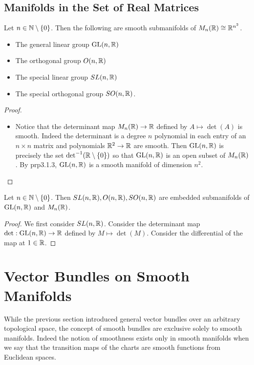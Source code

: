 \documentclass[a4paper]{article}
\begin{document}
\subsection{Manifolds in the Set of Real Matrices}
\begin{prp}{}{} Let $n\in\mathbb{N}\setminus\{0\}$. Then the following are smooth submanifolds of $M_n(\mathbb{R})\cong\mathbb{R}^{n^2}$. 
\begin{itemize}
\item The general linear group $\operatorname{GL}(n,\mathbb{R})$
\item The orthogonal group $O(n,\mathbb{R})$
\item The special linear group $SL(n,\mathbb{R})$
\item The special orthogonal group $SO(n,\mathbb{R})$. 
\end{itemize} \tcbline
\begin{proof}~\\
\begin{itemize}
\item Notice that the determinant map $M_n(\mathbb{R})\to\mathbb{R}$ defined by $A\mapsto\det(A)$ is smooth. Indeed the determinant is a degree $n$ polynomial in each entry of an $n\times n$ matrix and polynomials $\mathbb{R}^2\to\mathbb{R}$ are smooth. Then $\operatorname{GL}(n,\mathbb{R})$ is precisely the set $\det^{-1}(\mathbb{R}\setminus\{0\})$ so that $\operatorname{GL}(n,\mathbb{R})$ is an open subset of $M_n(\mathbb{R})$. By prp3.1.3, $\operatorname{GL}(n,\mathbb{R})$ is a smooth manifold of dimension $n^2$. 
\end{itemize}
\end{proof}
\end{prp}

\begin{prp}{}{} Let $n\in\mathbb{N}\setminus\{0\}$. Then $SL(n,\mathbb{R}),O(n,\mathbb{R}),SO(n,\mathbb{R})$ are embedded submanifolds of $\operatorname{GL}(n,\mathbb{R})$ and $M_n(\mathbb{R})$. \tcbline
\begin{proof}
We first consider $SL(n,\mathbb{R})$. Consider the determinant map $\det:\operatorname{GL}(n,\mathbb{R})\to\mathbb{R}$ defined by $M\mapsto\det(M)$. Consider the differential of the map at $1\in\mathbb{R}$. 
\end{proof}
\end{prp}

\pagebreak
\section{Vector Bundles on Smooth Manifolds}
While the previous section introduced general vector bundles over an arbitrary topological space, the concept of smooth bundles are exclusive solely to smooth manifolds. Indeed the notion of smoothness exists only in smooth manifolds when we say that the transition maps of the charts are smooth functions from Euclidean spaces. 
\end{document}
